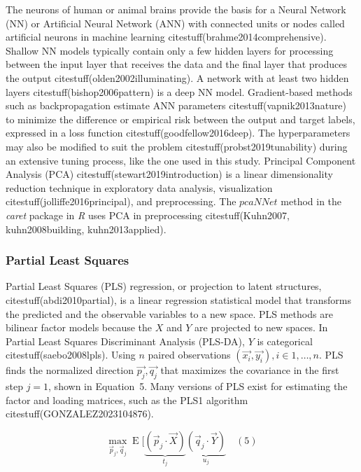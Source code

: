 \let\LaTeXcline\cline\documentclass[sn-mathphys-num]{sn-jnl}\let\cline\LaTeXcline
\begin{document}
The neurons of human or animal brains provide the basis for a Neural Network (NN) or Artificial Neural Network (ANN) with connected units or nodes called artificial neurons in machine learning citestuff(brahme2014comprehensive). Shallow NN models typically contain only a few hidden layers for processing between the input layer that receives the data and the final layer that produces the output citestuff(olden2002illuminating). A network with at least two hidden layers citestuff(bishop2006pattern) is a deep NN model. Gradient-based methods such as backpropagation estimate ANN parameters citestuff(vapnik2013nature) to minimize the difference or empirical risk between the output and target labels, expressed in a loss function citestuff(goodfellow2016deep). The hyperparameters may also be modified to suit the problem citestuff(probst2019tunability) during an extensive tuning process, like the one used in this study. Principal Component Analysis (PCA) citestuff(stewart2019introduction) is a linear dimensionality reduction technique in exploratory data analysis, visualization citestuff(jolliffe2016principal), and preprocessing. The $pcaNNet$ method in the \textit{caret} package in \textit{R} uses PCA in preprocessing citestuff(Kuhn2007, kuhn2008building, kuhn2013applied).

\subsubsection{Partial Least Squares}

Partial Least Squares (PLS) regression, or projection to latent structures, citestuff(abdi2010partial), is a linear regression statistical model that transforms the predicted and the observable variables to a new space. PLS methods are bilinear factor models because the $X$ and $Y$ are projected to new spaces. In Partial Least Squares Discriminant Analysis (PLS-DA), $Y$ is categorical citestuff(saebo2008lpls). Using $n$ paired observations $\left(\vec{x_{i}}, \vec{y_{i}}\right), i \in 1, \dots, n$. PLS finds the normalized direction $\vec{p_{j}}, \vec{q_{j}}$ that maximizes the covariance in the first step $j = 1$, shown in Equation~5. Many versions of PLS exist for estimating the factor and loading matrices, such as the PLS1 algorithm citestuff(GONZALEZ2023104876).

\begin{equation}
	\max_{{\vec{p}}_{j},{\vec{q}}_{j}}\operatorname{E} [\underbrace{({\vec{p}}_{j}\cdot {\vec{X}})}_{t_{j}}\underbrace{({\vec{q}}_{j}\cdot {\vec{Y}})}_{u_{j}}
	\quad\left(5\right)
\end{equation}
\end{document}

